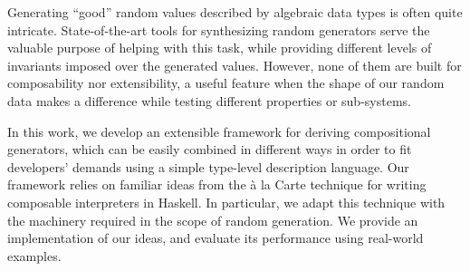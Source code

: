 Generating ``good'' random values described by algebraic data types is often
quite intricate.
%
State-of-the-art tools for synthesizing random generators serve the valuable
purpose of helping with this task, while providing different levels of
invariants imposed over the generated values.
%
However, none of them are built for composability nor extensibility, a useful
feature when the shape of our random data makes a difference while testing
different properties or sub-systems.
%


In this work, we develop an extensible framework for deriving compositional
generators, which can be easily combined in different ways in order to fit
developers' demands using a simple type-level description language.
%
Our framework relies on familiar ideas from the \`a la Carte technique for
writing composable interpreters in Haskell.
%
In particular, we adapt this technique with the machinery required in the scope
of random generation.
%
We provide an implementation of our ideas, and evaluate its performance using
real-world examples.
%